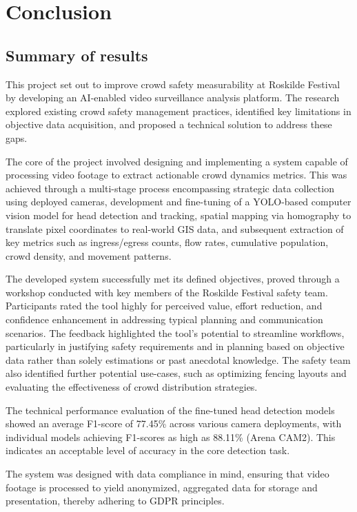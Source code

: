 \chapter{Conclusion}

\section{Summary of results}

This project set out to improve crowd safety measurability at Roskilde Festival by developing an AI-enabled video surveillance analysis platform. The research explored existing crowd safety management practices, identified key limitations in objective data acquisition, and proposed a technical solution to address these gaps.

The core of the project involved designing and implementing a system capable of processing video footage to extract actionable crowd dynamics metrics. This was achieved through a multi-stage process encompassing strategic data collection using deployed cameras, development and fine-tuning of a YOLO-based computer vision model for head detection and tracking, spatial mapping via homography to translate pixel coordinates to real-world GIS data, and subsequent extraction of key metrics such as ingress/egress counts, flow rates, cumulative population, crowd density, and movement patterns.

The developed system successfully met its defined objectives, proved through a workshop conducted with key members of the Roskilde Festival safety team.  Participants rated the tool highly for perceived value, effort reduction, and confidence enhancement in addressing typical planning and communication scenarios. The feedback highlighted the tool's potential to streamline workflows, particularly in justifying safety requirements and in planning based on objective data rather than solely estimations or past anecdotal knowledge. The safety team also identified further potential use-cases, such as optimizing fencing layouts and evaluating the effectiveness of crowd distribution strategies.

The technical performance evaluation of the fine-tuned head detection models showed an average F1-score of 77.45\% across various camera deployments, with individual models achieving F1-scores as high as 88.11\% (Arena CAM2). This indicates an acceptable level of accuracy in the core detection task.

The system was designed with data compliance in mind, ensuring that video footage is processed to yield anonymized, aggregated data for storage and presentation, thereby adhering to GDPR principles.

